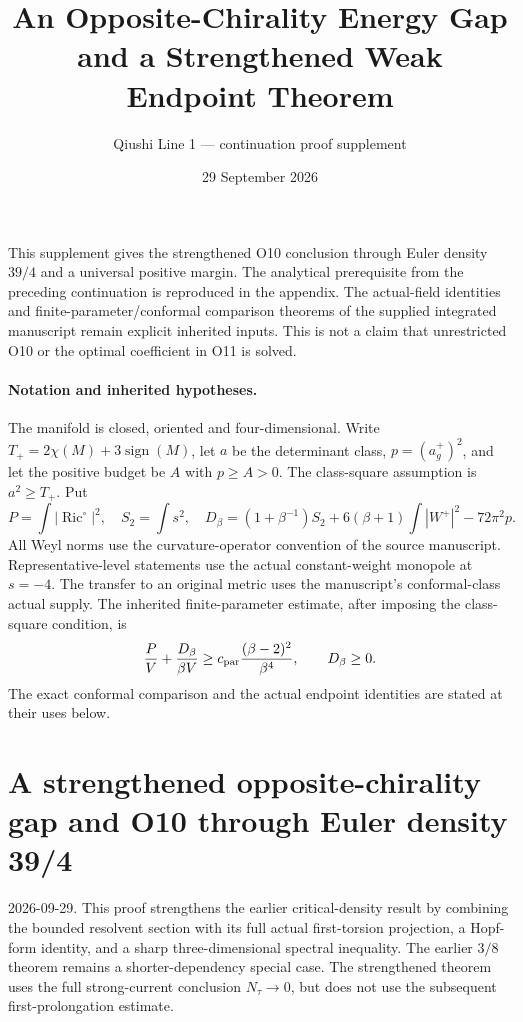 \documentclass[11pt]{article}
\title{An Opposite-Chirality Energy Gap and a Strengthened Weak Endpoint Theorem}
\author{Qiushi Line 1 --- continuation proof supplement}
\date{29 September 2026}
\begin{document}
\maketitle
\noindent This supplement gives the strengthened O10 conclusion through Euler density $39/4$ and a universal positive margin. The analytical prerequisite from the preceding continuation is reproduced in the appendix. The actual-field identities and finite-parameter/conformal comparison theorems of the supplied integrated manuscript remain explicit inherited inputs. This is not a claim that unrestricted O10 or the optimal coefficient in O11 is solved.
\tableofcontents
\clearpage
\paragraph{Notation and inherited hypotheses.}
The manifold is closed, oriented and four-dimensional. Write
$T_+=2\chi(M)+3\operatorname{sign}(M)$, let $a$ be the determinant class,
$p=(a_g^+)^2$, and let the positive budget be $A$ with $p\ge A>0$.
The class-square assumption is $a^2\ge T_+$. Put
\[
P=\int|\operatorname{Ric}^{\circ}|^2,\quad S_2=\int s^2,\quad
D_\beta=(1+\beta^{-1})S_2+6(\beta+1)\int|W^+|^2-72\pi^2p.
\]
All Weyl norms use the curvature-operator convention of the source manuscript.
Representative-level statements use the actual constant-weight monopole at $s=-4$.
The transfer to an original metric uses the manuscript's conformal-class actual supply.
The inherited finite-parameter estimate, after imposing the class-square condition, is
\[
\frac PV+\frac{D_\beta}{\beta V}
\ge c_{\rm par}\frac{(\beta-2)^2}{\beta^4},\qquad D_\beta\ge0.
\]
The exact conformal comparison and the actual endpoint identities are stated at their uses below.
\bigskip
\hypertarget{o10strength:a-strengthened-opposite-chirality-gap-and-o10-through-euler-density-394}{%
\section{A strengthened opposite-chirality gap and O10 through Euler
density
39/4}\label{o10strength:a-strengthened-opposite-chirality-gap-and-o10-through-euler-density-394}}

2026-09-29. This proof strengthens the earlier critical-density result
by combining the bounded resolvent section with its full actual
first-torsion projection, a Hopf-form identity, and a sharp
three-dimensional spectral inequality. The earlier \(3/8\) theorem
remains a shorter-dependency special case. The strengthened theorem uses
the full strong-current conclusion \(N_\tau\to0\), but does not use the
subsequent first-prolongation estimate.
\end{document}
